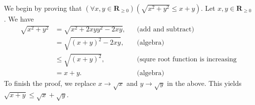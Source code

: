 \documentclass[12pt, fleqn]{exam}
\newcommand{\reals}{\mathbf{R}}
\begin{document}
\begin{questions}
\begin{solution} We begin by proving that $\left(\forall x,y \in \reals_{\geq 0}\right)(\sqrt{x^2 + y^2} \leq x + y) $.
Let $x,y \in \reals_{\geq 0}$. We have
\begin{align*}
\sqrt{x^2 + y^2} &= \sqrt{x^2 + 2 x y  y^2 - 2 x y}, &&\mbox{(add and subtract)} \\
                           &= \sqrt{(x + y)^2 - 2 x y}, &&\mbox{(algebra)} \\
                           &\leq \sqrt{(x + y)^2}, &&\mbox{(squre root function is increasing} \\
                           &= x + y.  &&\mbox{(algebra)} 
\end{align*}
To finish the proof, we replace $x \to \sqrt{x}$ and  $y \to \sqrt{y}$ in the above. This yields
$\sqrt{x+y} \leq \sqrt{x} + \sqrt{y}$.

\end{solution}
\end{questions}
\end{document}
